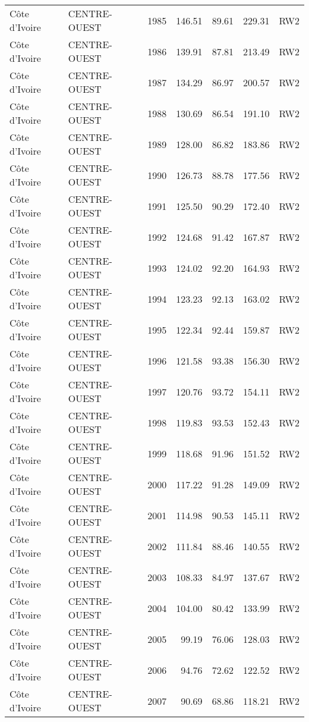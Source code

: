 \begin{longtable}{lllrrrl}
  C\^{o}te d'Ivoire & CENTRE-OUEST & 1985 & 146.51 & 89.61 & 229.31 & RW2 \\ 
  C\^{o}te d'Ivoire & CENTRE-OUEST & 1986 & 139.91 & 87.81 & 213.49 & RW2 \\ 
  C\^{o}te d'Ivoire & CENTRE-OUEST & 1987 & 134.29 & 86.97 & 200.57 & RW2 \\ 
  C\^{o}te d'Ivoire & CENTRE-OUEST & 1988 & 130.69 & 86.54 & 191.10 & RW2 \\ 
  C\^{o}te d'Ivoire & CENTRE-OUEST & 1989 & 128.00 & 86.82 & 183.86 & RW2 \\ 
  C\^{o}te d'Ivoire & CENTRE-OUEST & 1990 & 126.73 & 88.78 & 177.56 & RW2 \\ 
  C\^{o}te d'Ivoire & CENTRE-OUEST & 1991 & 125.50 & 90.29 & 172.40 & RW2 \\ 
  C\^{o}te d'Ivoire & CENTRE-OUEST & 1992 & 124.68 & 91.42 & 167.87 & RW2 \\ 
  C\^{o}te d'Ivoire & CENTRE-OUEST & 1993 & 124.02 & 92.20 & 164.93 & RW2 \\ 
  C\^{o}te d'Ivoire & CENTRE-OUEST & 1994 & 123.23 & 92.13 & 163.02 & RW2 \\ 
  C\^{o}te d'Ivoire & CENTRE-OUEST & 1995 & 122.34 & 92.44 & 159.87 & RW2 \\ 
  C\^{o}te d'Ivoire & CENTRE-OUEST & 1996 & 121.58 & 93.38 & 156.30 & RW2 \\ 
  C\^{o}te d'Ivoire & CENTRE-OUEST & 1997 & 120.76 & 93.72 & 154.11 & RW2 \\ 
  C\^{o}te d'Ivoire & CENTRE-OUEST & 1998 & 119.83 & 93.53 & 152.43 & RW2 \\ 
  C\^{o}te d'Ivoire & CENTRE-OUEST & 1999 & 118.68 & 91.96 & 151.52 & RW2 \\ 
  C\^{o}te d'Ivoire & CENTRE-OUEST & 2000 & 117.22 & 91.28 & 149.09 & RW2 \\ 
  C\^{o}te d'Ivoire & CENTRE-OUEST & 2001 & 114.98 & 90.53 & 145.11 & RW2 \\ 
  C\^{o}te d'Ivoire & CENTRE-OUEST & 2002 & 111.84 & 88.46 & 140.55 & RW2 \\ 
  C\^{o}te d'Ivoire & CENTRE-OUEST & 2003 & 108.33 & 84.97 & 137.67 & RW2 \\ 
  C\^{o}te d'Ivoire & CENTRE-OUEST & 2004 & 104.00 & 80.42 & 133.99 & RW2 \\ 
  C\^{o}te d'Ivoire & CENTRE-OUEST & 2005 & 99.19 & 76.06 & 128.03 & RW2 \\ 
  C\^{o}te d'Ivoire & CENTRE-OUEST & 2006 & 94.76 & 72.62 & 122.52 & RW2 \\ 
  C\^{o}te d'Ivoire & CENTRE-OUEST & 2007 & 90.69 & 68.86 & 118.21 & RW2 \\ 

\end{longtable}
